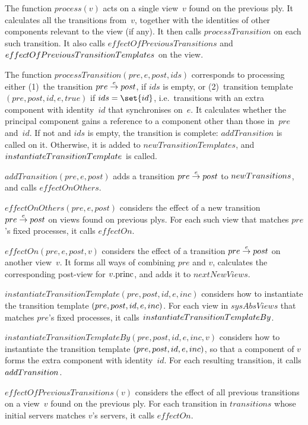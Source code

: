 The function $process(v)$ acts on a single view~$v$ found on the previous ply.
It calculates all the transitions from~$v$, together with the identities of
other components relevant to the view (if any).  It then calls
$processTransition$ on each such transition.  It also calls
$effectOfPreviousTransitions$ and $effect\-Of\-Previous\-TransitionTemplates$
on the view.

The function $processTransition(pre, e, post, ids)$ corresponds to processing
either (1)~the transition $pre \stackrel{e}\rightarrow post$, if $ids$ is empty, or
(2)~transition template $(pre, post, id, e, true)$ if $ids = \set{id}$,
i.e.~transitions with an extra component with identity~$id$ that synchronises
on~$e$.  It calculates whether the principal component gains a reference to a
component other than those in~$pre$ and~$id$.  If not and $ids$ is empty, the
transition is complete: $addTransition$ is called on it.  Otherwise, it is
added to $newTransitionTemplates$, and
$instantiate\-TransitionTemplate$ is called.

$addTransition(pre,e,post)$ adds a transition $pre \stackrel{e}\rightarrow post$ to
$new\-Transitions$, and calls $effectOnOthers$.

$effectOnOthers(pre,e,post)$ considers the effect of a new transition $pre
\stackrel{e}\rightarrow post$ on views found on previous plys.  For each such view that
matches $pre$'s fixed processes, it calls $effectOn$.

$effectOn(pre, e, post, v)$ considers the effect of a transition $pre
\stackrel{e}\rightarrow post$ on another view~$v$.  It forms all ways of combining $pre$ and
$v$, calculates the corresponding post-view for $v.\mathrm{princ}$, and adds it to
$nextNewViews$.

$instantiateTransitionTemplate(pre, post, id, e, inc)$ considers how to
instantiate the transition template $(pre, post,\linebreak[1] id,\linebreak[1]
e, inc)$.  For each view in $sysAbsViews$ that matches $pre$'s fixed
processes, it calls $instantiate\-Transition\-TemplateBy$.

$instantiateTransitionTemplateBy(pre, post, id, e, inc, v)$ considers how
to instantiate the transition template $(pre, post,\linebreak[1]
id,\linebreak[1] e, inc)$, so that a component of $v$ forms the extra
component with identity~$id$.  For each resulting transition, it calls
$add\-Transition$.

$effectOfPreviousTransitions(v)$ considers the effect of all previous
transitions on a view~$v$ found on the previous ply.  For each
transition in $transitions$ whose initial servers matches $v$'s servers, it
calls $effectOn$.

